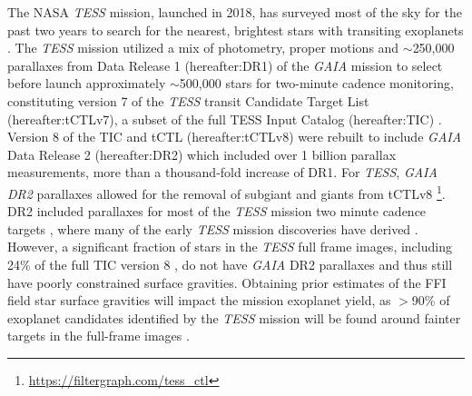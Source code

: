 The NASA \textit{TESS} mission, launched in 2018, has surveyed most of the sky for the past two years to search for the nearest, brightest stars with transiting exoplanets \citep{Ricker2015}. The \textit{TESS} mission utilized a mix of photometry, proper motions and $\sim$250,000 parallaxes from Data Release 1 (hereafter:DR1) of the \textit{GAIA} mission to select before launch approximately $\sim$500,000 stars for two-minute cadence monitoring, constituting version 7 of the \textit{TESS} transit Candidate Target List (hereafter:tCTLv7), a subset of the full TESS Input Catalog (hereafter:TIC) \citep{Stassun2018}. Version 8 of the TIC and tCTL (hereafter:tCTLv8) were rebuilt to include \textit{GAIA} Data Release 2 (hereafter:DR2) \citep{DR2} which included over 1 billion parallax measurements, more than a thousand-fold increase of DR1. For \textit{TESS}, \textit{GAIA DR2} parallaxes allowed for the removal of subgiant and giants from tCTLv8 \citep{Stassun2019}\footnote{\url{https://filtergraph.com/tess_ctl}}. DR2 included parallaxes for most of the \textit{TESS} mission two minute cadence targets \citep{Stassun2019}, where many of the early \textit{TESS} mission discoveries have derived \citep{Barclay2018,pi_men,Newton2019,Nielsen2019,Plavchan2020}. However, a significant fraction of stars in the \textit{TESS} full frame images, including 24\% of the full TIC version 8 \citep{Stassun2019}, do not have \textit{GAIA} DR2 parallaxes and thus still have poorly constrained surface gravities. Obtaining prior estimates of the FFI field star surface gravities will impact the mission exoplanet yield, as $>$90\% of exoplanet candidates identified by the \textit{TESS} mission will be found around fainter targets in the full-frame images \citep{Barclay2018}.

